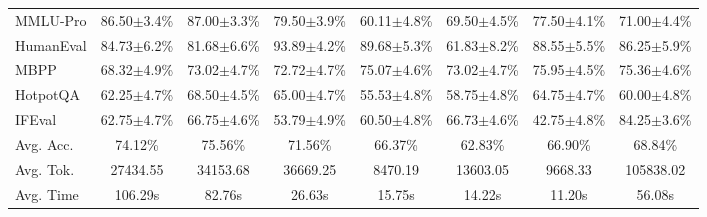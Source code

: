 \begin{table}[!t]
{\begin{tabular}{lccccccc}
            MMLU-Pro                    & 86.50{\scriptsize $\pm$3.4}\%  & 87.00{\scriptsize $\pm$3.3}\%  & 79.50{\scriptsize $\pm$3.9}\%  & 60.11{\scriptsize $\pm$4.8}\%  & 69.50{\scriptsize $\pm$4.5}\%  & 77.50{\scriptsize $\pm$4.1}\%  & 71.00{\scriptsize $\pm$4.4}\% \\
            HumanEval                   & 84.73{\scriptsize $\pm$6.2}\%  & 81.68{\scriptsize $\pm$6.6}\%  & 93.89{\scriptsize $\pm$4.2}\%  & 89.68{\scriptsize $\pm$5.3}\%  & 61.83{\scriptsize $\pm$8.2}\%  & 88.55{\scriptsize $\pm$5.5}\%  & 86.25{\scriptsize $\pm$5.9}\% \\
            MBPP                        & 68.32{\scriptsize $\pm$4.9}\%  & 73.02{\scriptsize $\pm$4.7}\%  & 72.72{\scriptsize $\pm$4.7}\%  & 75.07{\scriptsize $\pm$4.6}\%  & 73.02{\scriptsize $\pm$4.7}\%  & 75.95{\scriptsize $\pm$4.5}\%  & 75.36{\scriptsize $\pm$4.6}\% \\
            HotpotQA                    & 62.25{\scriptsize $\pm$4.7}\%  & 68.50{\scriptsize $\pm$4.5}\%  & 65.00{\scriptsize $\pm$4.7}\%  & 55.53{\scriptsize $\pm$4.8}\%  & 58.75{\scriptsize $\pm$4.8}\%  & 64.75{\scriptsize $\pm$4.7}\%  & 60.00{\scriptsize $\pm$4.8}\% \\
            IFEval                      & 62.75{\scriptsize $\pm$4.7}\%  & 66.75{\scriptsize $\pm$4.6}\%  & 53.79{\scriptsize $\pm$4.9}\%  & 60.50{\scriptsize $\pm$4.8}\%  & 66.73{\scriptsize $\pm$4.6}\%  & 42.75{\scriptsize $\pm$4.8}\%  & 84.25{\scriptsize $\pm$3.6}\% \\
            \midrule
            Avg. Acc.                   & 74.12\%                        & 75.56\%                        & 71.56\%                        & 66.37\%                        & 62.83\%                        & 66.90\%                        & 68.84\%                       \\
            Avg. Tok.                   & 27434.55                       & 34153.68                       & 36669.25                       & 8470.19                        & 13603.05                       & 9668.33                        & 105838.02                     \\
            Avg. Time                   & 106.29s                        & 82.76s                         & 26.63s                         & 15.75s                         & 14.22s                         & 11.20s                         & 56.08s                        \\
            \bottomrule
        \end{tabular}
    }
    \renewcommand{\arraystretch}{1.0}
\end{table}

